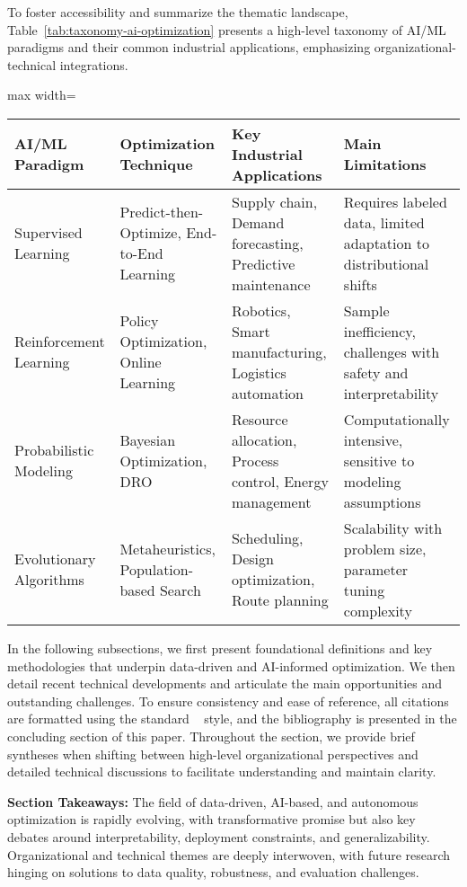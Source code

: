 \documentclass[sigconf]{acmart}
\begin{document}
To foster accessibility and summarize the thematic landscape, Table~\ref{tab:taxonomy-ai-optimization} presents a high-level taxonomy of AI/ML paradigms and their common industrial applications, emphasizing organizational-technical integrations.

\begin{table*}[htbp]
\centering
\caption{Taxonomy of AI/ML Paradigms in Optimization and Industrial Application Areas}
\label{tab:taxonomy-ai-optimization}
\begin{adjustbox}{max width=\textwidth}
\begin{tabular}{@{}llll@{}}
\toprule
AI/ML Paradigm & Optimization Technique & Key Industrial Applications & Main Limitations \\
\midrule
Supervised Learning & Predict-then-Optimize, End-to-End Learning & Supply chain, Demand forecasting, Predictive maintenance & Requires labeled data, limited adaptation to distributional shifts \\
Reinforcement Learning & Policy Optimization, Online Learning & Robotics, Smart manufacturing, Logistics automation & Sample inefficiency, challenges with safety and interpretability \\
Probabilistic Modeling & Bayesian Optimization, DRO & Resource allocation, Process control, Energy management & Computationally intensive, sensitive to modeling assumptions \\
Evolutionary Algorithms & Metaheuristics, Population-based Search & Scheduling, Design optimization, Route planning & Scalability with problem size, parameter tuning complexity \\
\bottomrule
\end{tabular}
\end{adjustbox}
\end{table*}

In the following subsections, we first present foundational definitions and key methodologies that underpin data-driven and AI-informed optimization. We then detail recent technical developments and articulate the main opportunities and outstanding challenges. To ensure consistency and ease of reference, all citations are formatted using the standard ~\cite{} style, and the bibliography is presented in the concluding section of this paper. Throughout the section, we provide brief syntheses when shifting between high-level organizational perspectives and detailed technical discussions to facilitate understanding and maintain clarity.

\textbf{Section Takeaways:} 
The field of data-driven, AI-based, and autonomous optimization is rapidly evolving, with transformative promise but also key debates around interpretability, deployment constraints, and generalizability. Organizational and technical themes are deeply interwoven, with future research hinging on solutions to data quality, robustness, and evaluation challenges.
\end{document}
